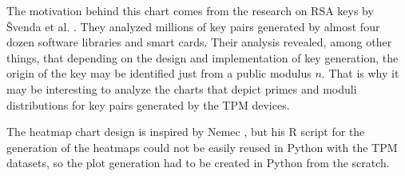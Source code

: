 The motivation behind this chart comes from the research on RSA keys by Švenda et al. \cite{svenda-1mrsa_usenix2016}. They analyzed millions of key pairs generated by almost four dozen software libraries and smart cards. Their analysis revealed, among other things, that depending on the design and implementation of key generation, the origin of the key may be identified just from a public modulus $n$. That is why it may be interesting to analyze the charts that depict primes and moduli distributions for key pairs generated by the TPM devices.

The heatmap chart design is inspired by Nemec \cite{Nemec2016thesis}, but his R script for the generation of the heatmaps could not be easily reused in Python with the TPM datasets, so the plot generation had to be created in Python from the scratch.

